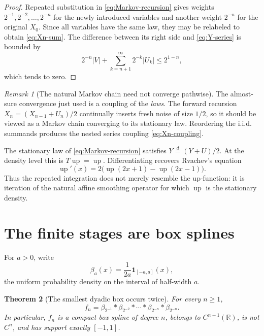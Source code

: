 \documentclass[11pt,oneside]{article}
\newtheorem{theorem}{Theorem}[section]
\theoremstyle{definition}
\theoremstyle{remark}
\newtheorem{remark}[theorem]{Remark}
\newcommand{\R}{\mathbb R}
\newcommand{\Up}{\operatorname{up}}
\begin{document}
\begin{proof}
Repeated substitution in \eqref{eq:Markov-recursion} gives weights
$2^{-1},2^{-2},\ldots,2^{-n}$ for the newly introduced variables and another weight $2^{-n}$
for the original $X_0$.  Since all variables have the same law, they may be relabeled to obtain
\eqref{eq:Xn-sum}.  The difference between its right side and \eqref{eq:Y-series} is bounded by
\[
 2^{-n}|V|+\sum_{k=n+1}^{\infty}2^{-k}|U_k|\le2^{1-n},
\]
which tends to zero.
\end{proof}

\begin{remark}[The natural Markov chain need not converge pathwise]
The almost-sure convergence just used is a coupling of the \emph{laws}.  The forward recursion
$X_n=(X_{n-1}+U_n)/2$ continually inserts fresh noise of size $1/2$, so it should be viewed as
a Markov chain converging to its stationary law.  Reordering the i.i.d. summands produces the
nested series coupling \eqref{eq:Xn-coupling}.
\end{remark}

The stationary law of \eqref{eq:Markov-recursion} satisfies
$Y\overset d=(Y+U)/2$.  At the density level this is $T\Up=\Up$.  Differentiating recovers
Rvachev's equation
\begin{equation}
 \Up'(x)=2\bigl(\Up(2x+1)-\Up(2x-1)\bigr).                \label{eq:up-diffeq}
\end{equation}
Thus the repeated integration does not merely resemble the up-function: it is iteration of
the natural affine smoothing operator for which $\Up$ is the stationary density.

\section{The finite stages are box splines}
\label{sec:box-splines}

For $a>0$, write
\begin{equation}
 \beta_a(x)=\frac1{2a}\mathbf 1_{[-a,a]}(x),               \label{eq:beta}
\end{equation}
the uniform probability density on the interval of half-width $a$.

\begin{theorem}[The smallest dyadic box occurs twice]
\label{thm:box-convolution}
For every $n\ge1$,
\begin{equation}
 \boxed{\displaystyle
 f_n=\beta_{2^{-1}}*\beta_{2^{-2}}*\cdots*\beta_{2^{-n}}*\beta_{2^{-n}}.}
                                                                    \label{eq:fn-box}
\end{equation}
In particular, $f_n$ is a compact box spline of degree $n$, belongs to $C^{n-1}(\R)$, is not
$C^n$, and has support exactly $[-1,1]$.
\end{theorem}
\end{document}
